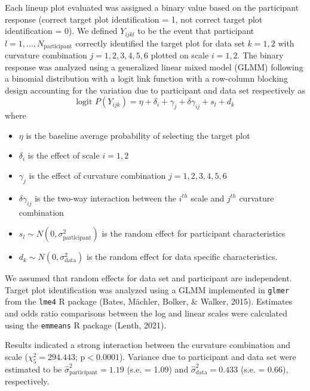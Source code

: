 \documentclass[print]{nuthesis}
\begin{document}
Each lineup plot evaluated was assigned a binary value based on the participant response (correct target plot identification = 1, not correct target plot identification = 0).
We defined \(Y_{ijkl}\) to be the event that participant \(l = 1,...,N_\text{participant}\) correctly identified the target plot for data set \(k = 1,2\) with curvature combination \(j = 1,2,3,4,5,6\) plotted on scale \(i = 1,2\).
The binary response was analyzed using a generalized linear mixed model (GLMM) following a binomial distribution with a logit link function with a row-column blocking design accounting for the variation due to participant and data set respectively as
\begin{equation}
\text{logit }P(Y_{ijk}) = \eta + \delta_i + \gamma_j + \delta \gamma_{ij} + s_l + d_k
\end{equation}
\noindent where

\begin{itemize}
\item $\eta$ is the baseline average probability of selecting the target plot
\item $\delta_i$ is the effect of scale $i = 1,2$
\item $\gamma_j$ is the effect of curvature combination $j = 1,2,3,4,5,6$
\item $\delta\gamma_{ij}$ is the two-way interaction between the $i^{th}$ scale and $j^{th}$ curvature combination
\item $s_l \sim N(0,\sigma^2_\text{participant})$ is the random effect for participant characteristics
\item $d_k \sim N(0,\sigma^2_{\text{data}})$ is the random effect for data specific characteristics. 
\end{itemize}

\noindent We assumed that random effects for data set and participant are independent.
Target plot identification was analyzed using a GLMM implemented in \texttt{glmer} from the \texttt{lme4} R package (Bates, Mächler, Bolker, \& Walker, 2015).
Estimates and odds ratio comparisons between the log and linear scales were calculated using the \texttt{emmeans} R package (Lenth, 2021).

Results indicated a strong interaction between the curvature combination and scale (\(\chi^2_5 = 294.443\); \(\text{p} <0.0001\)). Variance due to participant and data set were estimated to be \(\hat\sigma^2_{\text{participant}} = 1.19\) (s.e. = 1.09) and \(\hat\sigma^2_{\text{data}} = 0.433\) (s.e. = 0.66), respectively.
\end{document}

